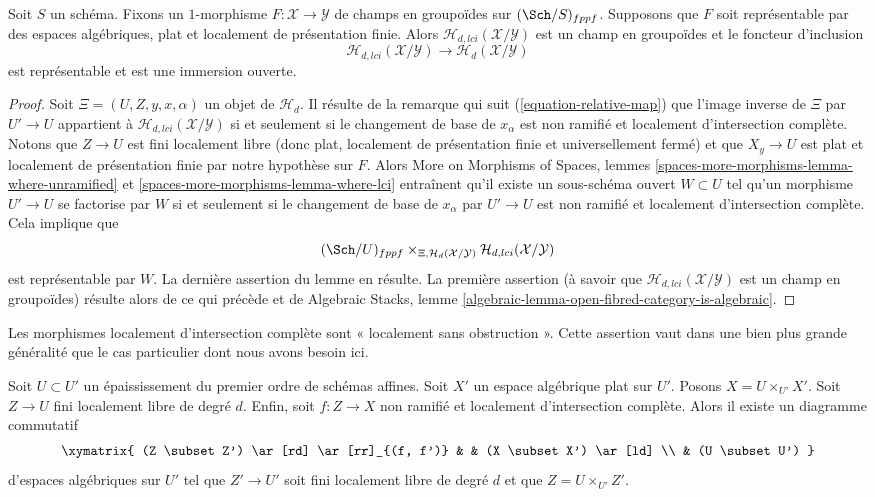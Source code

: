 \begin{lemma}
\label{lemma-lci-locus-stack-in-groupoids}
Soit $S$ un schéma. Fixons un $1$-morphisme
$F : \mathcal{X} \longrightarrow \mathcal{Y}$
de champs en groupoïdes sur $(\Sch/S)_{fppf}$.
Supposons que $F$ soit représentable par des espaces algébriques, plat et localement
de présentation finie. Alors $\mathcal{H}_{d, lci}(\mathcal{X}/\mathcal{Y})$
est un champ en groupoïdes et le foncteur d'inclusion
$$
\mathcal{H}_{d, lci}(\mathcal{X}/\mathcal{Y})
\longrightarrow
\mathcal{H}_d(\mathcal{X}/\mathcal{Y})
$$
est représentable et est une immersion ouverte.
\end{lemma}

\begin{proof}
Soit $\Xi = (U, Z, y, x, \alpha)$ un objet de $\mathcal{H}_d$. Il résulte
de la remarque qui suit
(\ref{equation-relative-map})
que l'image inverse de $\Xi$ par $U' \to U$ appartient à
$\mathcal{H}_{d, lci}(\mathcal{X}/\mathcal{Y})$ si et seulement si le changement
de base de $x_\alpha$ est non ramifié et localement d'intersection complète.
Notons que $Z \to U$ est fini localement libre (donc plat, localement de
présentation finie et universellement fermé) et que $X_y \to U$ est
plat et localement de présentation finie par notre hypothèse sur $F$. Alors
More on Morphisms of Spaces, lemmes
\ref{spaces-more-morphisms-lemma-where-unramified} et
\ref{spaces-more-morphisms-lemma-where-lci}
entraînent qu'il existe un sous-schéma ouvert $W \subset U$ tel qu'un morphisme
$U' \to U$ se factorise par $W$ si et seulement si le changement de base de
$x_\alpha$ par $U' \to U$ est non ramifié et localement d'intersection
complète. Cela implique que
$$
(\Sch/U)_{fppf}
\times_{\Xi, \mathcal{H}_d(\mathcal{X}/\mathcal{Y})}
\mathcal{H}_{d, lci}(\mathcal{X}/\mathcal{Y})
$$
est représentable par $W$. La dernière assertion du lemme
en résulte. La première assertion (à savoir que
$\mathcal{H}_{d, lci}(\mathcal{X}/\mathcal{Y})$ est un champ en groupoïdes)
résulte alors de ce qui précède et de
Algebraic Stacks,
lemme \ref{algebraic-lemma-open-fibred-category-is-algebraic}.
\end{proof}

\noindent
Les morphismes localement d'intersection complète sont « localement sans obstruction ».
Cette assertion vaut dans une bien plus grande généralité que le cas particulier
dont nous avons besoin ici.

\begin{lemma}
\label{lemma-lci-unobstructed}
Soit $U \subset U'$ un épaississement du premier ordre de schémas affines.
Soit $X'$ un espace algébrique plat sur $U'$. Posons $X = U \times_{U'} X'$.
Soit $Z \to U$ fini localement libre de degré $d$. Enfin, soit
$f : Z \to X$ non ramifié et localement d'intersection complète.
Alors il existe un diagramme commutatif
$$
\xymatrix{
(Z \subset Z') \ar[rd] \ar[rr]_{(f, f')} & & (X \subset X') \ar[ld] \\
& (U \subset U')
}
$$
d'espaces algébriques sur $U'$ tel que $Z' \to U'$ soit fini localement libre
de degré $d$ et que $Z = U \times_{U'} Z'$.
\end{lemma}

